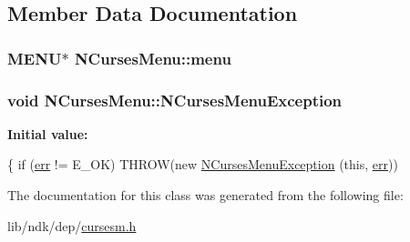 \subsection{Member Data Documentation}
\hypertarget{class_n_curses_menu_a7fcf6bc30a980fa5e30b5f349fd1909d}{
\subsubsection[{menu}]{\setlength{\rightskip}{0pt plus 5cm}M\-E\-N\-U$\ast$ N\-Curses\-Menu\-::menu\hspace{0.3cm}{\ttfamily [protected]}}}\label{class_n_curses_menu_a7fcf6bc30a980fa5e30b5f349fd1909d}
\hypertarget{class_n_curses_menu_a050594e68b0bd4ecbe44ea1609763a22}{
\subsubsection[{N\-Curses\-Menu\-Exception}]{\setlength{\rightskip}{0pt plus 5cm}void N\-Curses\-Menu\-::\-N\-Curses\-Menu\-Exception\hspace{0.3cm}{\ttfamily [protected]}}}\label{class_n_curses_menu_a050594e68b0bd4ecbe44ea1609763a22}
{\bfseries Initial value\-:}
\begin{DoxyCode}
\{
    \textcolor{keywordflow}{if} (\hyperlink{class_n_curses_panel_a36889096b2df7770196fa535c6333068}{err} != E\_OK)
      THROW(\textcolor{keyword}{new} \hyperlink{class_n_curses_menu_a050594e68b0bd4ecbe44ea1609763a22}{NCursesMenuException} (\textcolor{keyword}{this}, \hyperlink{class_n_curses_panel_a36889096b2df7770196fa535c6333068}{err}))
\end{DoxyCode}


The documentation for this class was generated from the following file\-:\begin{DoxyCompactItemize}
\item 
lib/ndk/dep/\hyperlink{cursesm_8h}{cursesm.\-h}\end{DoxyCompactItemize}
